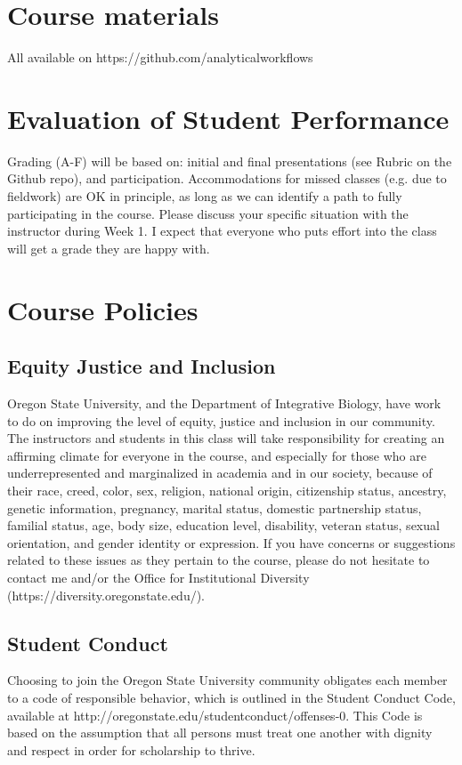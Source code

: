 \documentclass[]{article}
\begin{document}
\section*{Course materials}
All available on https://github.com/analyticalworkflows

\section*{Evaluation of Student Performance}
Grading (A-F) will be based on: initial and final presentations (see Rubric on the Github repo), and participation. Accommodations for missed classes (e.g. due to fieldwork) are OK in principle, as long as we can identify a path to fully participating in the course. Please discuss your specific situation with the instructor during Week 1. I expect that everyone who puts effort into the class will get a grade they are happy with.


\section*{Course Policies}

\subsection*{Equity Justice and Inclusion}
Oregon State University, and the Department of Integrative Biology, have work to do on improving the level of equity, justice and inclusion in our community. The instructors and students in this class will take responsibility for creating an affirming climate for everyone in the course, and especially for those who are underrepresented and marginalized in academia and in our society, because of their race, creed, color, sex, religion, national origin, citizenship status, ancestry, genetic information, pregnancy, marital status, domestic partnership status, familial status, age, body size, education level, disability, veteran status, sexual orientation, and gender identity or expression. If you have concerns or suggestions related to these issues as they pertain to the course, please do not hesitate to contact me and/or the Office for Institutional Diversity (https://diversity.oregonstate.edu/).

\subsection*{Student Conduct}
Choosing to join the Oregon State University community obligates each member to a code of responsible behavior, which is outlined in the Student Conduct Code, available at http://oregonstate.edu/studentconduct/offenses-0.  This Code is based on the assumption that all persons must treat one another with dignity and respect in order for scholarship to thrive.  
\end{document}
